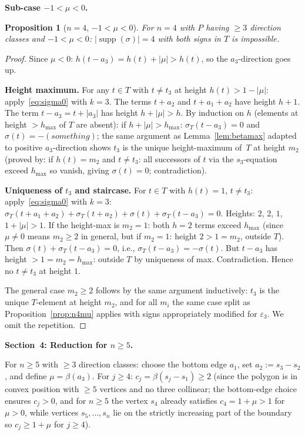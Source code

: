 \documentclass{article}
\newtheorem{prop}{Proposition}
\begin{document}
\medskip
\noindent\textbf{Sub-case $-1<\mu<0$.}

\begin{prop}[$n=4$, $-1<\mu<0$]\label{prop:n4muneg}
For $n=4$ with $P$ having $\ge 3$ direction classes and $-1<\mu<0$:
$|\operatorname{supp}(\sigma)|=4$ with both signs in $T$ is impossible.
\end{prop}
\begin{proof}
Since $\mu<0$: $h(t-a_3)=h(t)+|\mu|>h(t)$, so the $a_3$-direction goes up.

\textbf{Height maximum.}
For any $t\in T$ with $t\ne t_3$ at height $h(t)>1-|\mu|$: apply~\eqref{eq:sigma0}
with $k=3$.  The terms $t+a_2$ and $t+a_1+a_2$ have height $h+1$.
The term $t-a_3=t+|a_3|$ has height $h+|\mu|>h$.
By induction on $h$ (elements at height $>h_{\max}$ of $T$ are absent):
if $h+|\mu|>h_{\max}$: $\sigma_T(t-a_3)=0$ and $\sigma(t)=-(something)$;
the same argument as Lemma~\ref{lem:betamax} adapted to positive $a_3$-direction
shows $t_3$ is the unique height-maximum of~$T$ at height $m_2$
(proved by: if $h(t)=m_2$ and $t\ne t_3$: all successors of $t$ via the $s_3$-equation
exceed $h_{\max}$ so vanish, giving $\sigma(t)=0$; contradiction).

\textbf{Uniqueness of $t_3$ and staircase.}
For $t\in T$ with $h(t)=1$, $t\ne t_3$:
apply~\eqref{eq:sigma0} with $k=3$:
$\sigma_T(t+a_1+a_2)+\sigma_T(t+a_2)+\sigma(t)+\sigma_T(t-a_3)=0$.
Heights: $2$, $2$, $1$, $1+|\mu|>1$.
If the height-max is $m_2=1$: both $h=2$ terms exceed $h_{\max}$ (since $\mu\ne 0$ means
$m_2\ge 2$ in general, but if $m_2=1$: height $2>1=m_2$, outside $T$).
Then $\sigma(t)+\sigma_T(t-a_3)=0$, i.e., $\sigma_T(t-a_3)=-\sigma(t)$.
But $t-a_3$ has height $>1=m_2=h_{\max}$: outside $T$ by uniqueness of max.
Contradiction.  Hence no $t\ne t_3$ at height $1$.

The general case $m_2\ge 2$ follows by the same argument inductively:
$t_3$ is the unique $T$-element at height $m_2$, and for all $m_i$ the same
case split as Proposition~\ref{prop:n4mu} applies with signs appropriately
modified for $\varepsilon_3$.  We omit the repetition.
\end{proof}

\bigskip
\noindent\textbf{Section~4: Reduction for $n\ge 5$.}

For $n\ge 5$ with $\ge 3$ direction classes: choose the bottom edge $a_1$, set
$a_2:=s_3-s_2$, and define $\mu=\beta(a_3)$.
For $j\ge 4$: $c_j=\beta(s_j-s_1)\ge 2$ (since the polygon is in convex position with
$\ge 5$ vertices and no three collinear; the bottom-edge choice ensures $c_j>0$,
and for $n\ge 5$ the vertex $s_4$ already satisfies $c_4=1+\mu>1$ for $\mu>0$,
while vertices $s_5,\dots,s_n$ lie on the strictly increasing part of the boundary
so $c_j\ge 1+\mu$ for $j\ge 4$).
\end{document}

